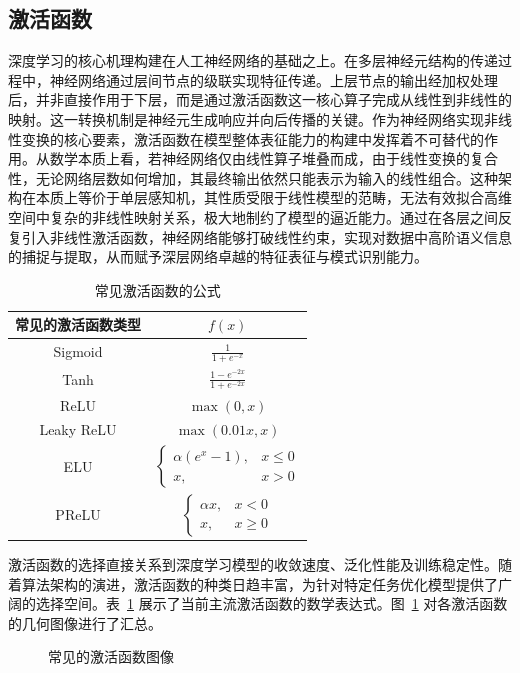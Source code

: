 \subsection{激活函数}
深度学习的核心机理构建在人工神经网络的基础之上。在多层神经元结构的传递过程中，神经网络通过层间节点的级联实现特征传递。上层节点的输出经加权处理后，并非直接作用于下层，而是通过激活函数这一核心算子完成从线性到非线性的映射。这一转换机制是神经元生成响应并向后传播的关键。作为神经网络实现非线性变换的核心要素，激活函数在模型整体表征能力的构建中发挥着不可替代的作用。从数学本质上看，若神经网络仅由线性算子堆叠而成，由于线性变换的复合性，无论网络层数如何增加，其最终输出依然只能表示为输入的线性组合。这种架构在本质上等价于单层感知机，其性质受限于线性模型的范畴，无法有效拟合高维空间中复杂的非线性映射关系，极大地制约了模型的逼近能力。通过在各层之间反复引入非线性激活函数，神经网络能够打破线性约束，实现对数据中高阶语义信息的捕捉与提取，从而赋予深层网络卓越的特征表征与模式识别能力。
\begin{table}[h]
    \centering
    \renewcommand{\arraystretch}{2}
    \caption{常见激活函数的公式}
    \label{table:activation}
    \begin{tabular}{cc}
        \hline
        \textbf{常见的激活函数类型} & $f(x)$ \\ \hline
        Sigmoid & $\displaystyle \frac{1}{1 + e^{-x}}$ \\
        Tanh & $\displaystyle \frac{1 - e^{-2x}}{1 + e^{-2x}}$ \\
        ReLU & $\max(0, x)$ \\
        Leaky ReLU & $\max(0.01x, x)$ \\
        ELU & $\begin{cases} \alpha(e^x - 1), & x \le 0 \\ x, & x > 0 \end{cases}$ \\
        PReLU & $\begin{cases} \alpha x, & x < 0 \\ x, & x \ge 0 \end{cases}$ \\ \hline
    \end{tabular}    
\end{table}

激活函数的选择直接关系到深度学习模型的收敛速度、泛化性能及训练稳定性。随着算法架构的演进，激活函数的种类日趋丰富，为针对特定任务优化模型提供了广阔的选择空间。表~\ref{table:activation} 展示了当前主流激活函数的数学表达式。图~\ref{fig:activation} 对各激活函数的几何图像进行了汇总。
\begin{figure}[htbp]
  \centering
  \caption{常见的激活函数图像}
  \label{fig:activation}
\end{figure}


